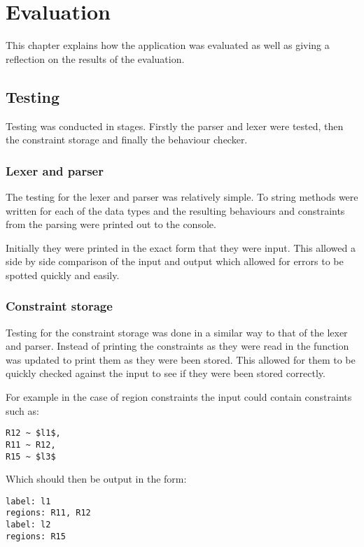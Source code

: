 \chapter{Evaluation} \label{chaptest}

This chapter explains how the application was evaluated as well as giving a reflection on the results of the evaluation.

\section{Testing}

Testing was conducted in stages. Firstly the parser and lexer were tested, then the constraint storage and finally the behaviour checker.

\subsection{Lexer and parser}

The testing for the lexer and parser was relatively simple. To string methods were written for each of the data types and the resulting behaviours and constraints from the parsing were printed out to the console. 

Initially they were printed in the exact form that they were input. This allowed a side by side comparison of the input and output which allowed for errors to be spotted quickly and easily. 

\subsection{Constraint storage}

Testing for the constraint storage was done in a similar way to that of the lexer and parser. Instead of printing the constraints as they were read in the function was updated to print them as they were been stored. This allowed for them to be quickly checked against the input to see if they were been stored correctly. 

For example in the case of region constraints the input could contain constraints such as: 

\begin{lstlisting}
R12 ~ $l1$, 
R11 ~ R12,
R15 ~ $l3$
\end{lstlisting}

Which should then be output in the form: 

\begin{lstlisting}
label: l1
regions: R11, R12
label: l2
regions: R15
\end{lstlisting}

